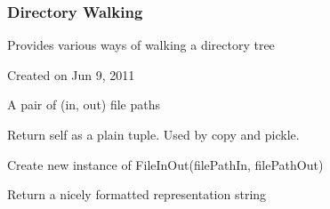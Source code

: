 \documentclass[letterpaper,10pt,english]{sphinxmanual}
\begin{document}
\subsubsection{Directory Walking}
\label{\detokenize{ref/util/DirWalk:module-TotalDepth.util.DirWalk}}\label{\detokenize{ref/util/DirWalk:directory-walking}}\label{\detokenize{ref/util/DirWalk::doc}}
Provides various ways of walking a directory tree

Created on Jun 9, 2011

\begin{fulllineitems}
\label{\detokenize{ref/util/DirWalk:TotalDepth.util.DirWalk.FileInOut}}
A pair of (in, out) file paths

\begin{fulllineitems}
\label{\detokenize{ref/util/DirWalk:TotalDepth.util.DirWalk.FileInOut.__getnewargs__}}
Return self as a plain tuple.  Used by copy and pickle.

\end{fulllineitems}


\begin{fulllineitems}
\label{\detokenize{ref/util/DirWalk:TotalDepth.util.DirWalk.FileInOut.__new__}}
Create new instance of FileInOut(filePathIn, filePathOut)

\end{fulllineitems}


\begin{fulllineitems}
\label{\detokenize{ref/util/DirWalk:TotalDepth.util.DirWalk.FileInOut.__repr__}}
Return a nicely formatted representation string

\end{fulllineitems}



\end{fulllineitems}
\end{document}
